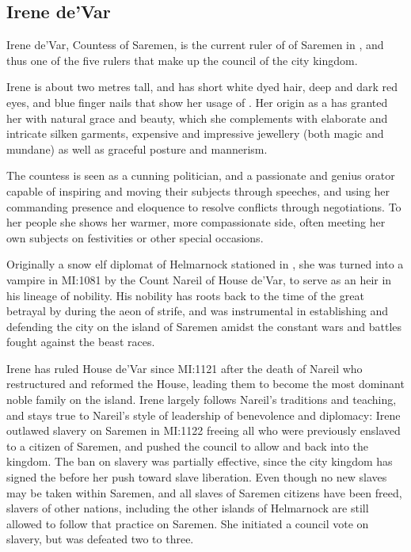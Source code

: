 \subsection{Irene de'Var}
\label{sec:Irene deVar}

Irene de'Var, Countess of Saremen, is the current ruler of  of Saremen in , and thus one of the five
rulers that make up the council of the city kingdom.

Irene is about two metres tall, and has short white dyed hair, deep and dark
red eyes, and blue finger nails that show her usage of .
Her origin as a  has granted her with natural grace and
beauty, which she complements with elaborate and intricate silken garments,
expensive and impressive jewellery (both magic and mundane) as well as
graceful posture and mannerism.

The countess is seen as a cunning politician, and a passionate and genius
orator capable of inspiring and moving their subjects through speeches, and
using her commanding presence and eloquence to resolve conflicts through
negotiations. To her people she shows her warmer, more compassionate side,
often meeting her own subjects on festivities or other special occasions.

Originally a snow elf diplomat of Helmarnock stationed in ,
she was turned into a vampire in MI:1081 by the Count Nareil of House de'Var,
to serve as an heir in his lineage of nobility. His nobility has roots back to
the time of the great betrayal by  during the aeon of
strife, and was instrumental in establishing and defending the city on the
island of Saremen amidst the constant wars and battles fought against the
beast races.

Irene has ruled House de'Var since MI:1121 after the death of Nareil who
restructured and reformed the House, leading them to become the most dominant
noble family on the island. Irene largely follows Nareil's traditions and
teaching, and stays true to Nareil's style of leadership of benevolence and
diplomacy: Irene outlawed slavery on Saremen in MI:1122 freeing all who were
previously enslaved to a citizen of Saremen, and pushed the council to allow
 and  back into the kingdom. The ban
on slavery was partially effective, since the city kingdom has signed the
 before her push toward slave liberation. Even
though no new slaves may be taken within Saremen, and all slaves of Saremen
citizens have been freed, slavers of other nations, including the other
islands of Helmarnock are still allowed to follow that practice on Saremen.
She initiated a council vote on slavery, but was defeated two to three.

